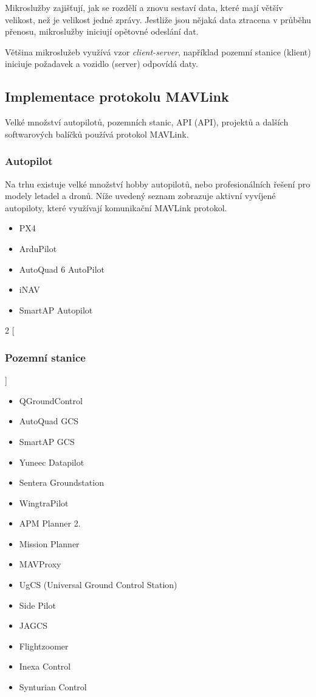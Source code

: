 Mikroslužby zajišťují, jak se rozdělí a znovu sestaví data, které mají většív velikost, než je velikost jedné zprávy. Jestliže jsou nějaká data ztracena v průběhu přenosu, mikroslužby iniciují opětovné odeslání dat.

Většina mikroslužeb využívá vzor \textit{client-server}, například pozemní stanice (klient) iniciuje požadavek a vozidlo (server) odpovídá daty.

\subsection{Implementace protokolu MAVLink}

Velké množství autopilotů, pozemních stanic, \acl{API} (\acs{API}), projektů a dalších softwarových balíčků používá protokol MAVLink.

\subsubsection{Autopilot}

Na trhu existuje velké množství hobby autopilotů, nebo profesionálních řešení pro modely letadel a dronů. Níže uvedený seznam zobrazuje aktivní vyvíjené autopiloty, které využívají komunikační MAVLink protokol.  \cite{MAVLINK}

\begin{itemize}
    \item PX4
    \item ArduPilot
    \item AutoQuad 6 AutoPilot
    \item iNAV
    \item SmartAP Autopilot\\
\end{itemize}


\begin{multicols}{2}
[
\subsubsection{Pozemní stanice}
]
    \begin{itemize}
        \item QGroundControl
        \item AutoQuad GCS
        \item SmartAP GCS
        \item Yuneec Datapilot
        \item Sentera Groundstation
        \item WingtraPilot
        \item APM Planner 2.
        \item Mission Planner
        \item MAVProxy
        \item UgCS (Universal Ground Control Station)
        \item Side Pilot
        \item JAGCS
        \item Flightzoomer
        \item Inexa Control
        \item Synturian Control
    \end{itemize}
\end{multicols}

